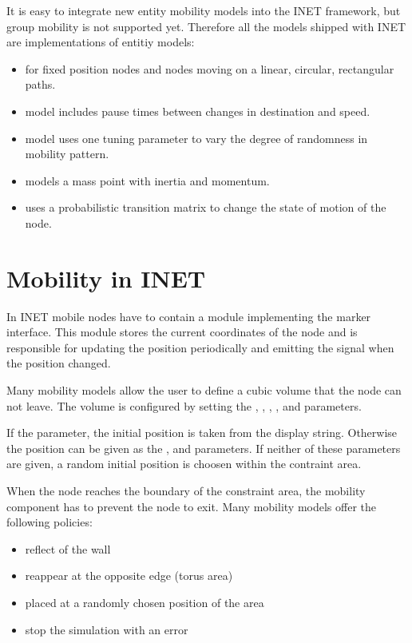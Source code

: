 It is easy to integrate new entity mobility models into the INET framework,
but group mobility is not supported yet. Therefore all the models
shipped with INET are implementations of entitiy models:

\begin{itemize}
\item {} for fixed position nodes and nodes
      moving on a linear, circular, rectangular paths.
\item {} model includes pause times between changes
      in destination and speed.
\item {} model uses one tuning parameter to vary the degree
      of randomness in mobility pattern.
\item {} models a mass point with inertia and momentum.
\item {} uses a probabilistic transition matrix to change
      the state of motion of the node.
\end{itemize}

\section{Mobility in INET}

In INET mobile nodes have to contain a module implementing the
 marker interface. This module stores the current
coordinates of the node and is responsible for updating the position
periodically and emitting the  signal
when the position changed.

Many mobility models allow the user to define a cubic volume that the node 
can not leave. The volume is configured by setting the , 
, ,
,  and
 parameters.

If the  parameter, the initial position is taken from
the display string. Otherwise the position can be given as the ,
 and  parameters. If neither of these parameters
are given, a random initial position is choosen within the contraint area.

When the node reaches the boundary of the constraint area, the mobility
component has to prevent the node to exit. Many mobility models offer the 
following policies:

\begin{itemize}
  \item reflect of the wall
  \item reappear at the opposite edge (torus area)
  \item placed at a randomly chosen position of the area
  \item stop the simulation with an error
\end{itemize}

